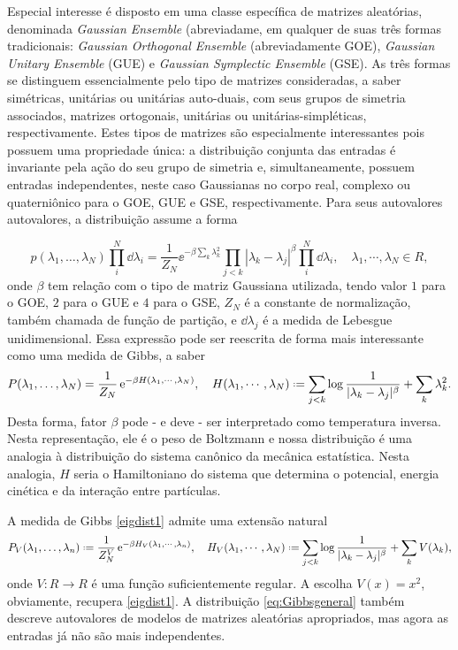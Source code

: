Especial interesse é disposto em uma classe específica de matrizes aleatórias, denominada \textit{Gaussian Ensemble} (abreviadame, em qualquer de suas três formas tradicionais:  \textit{Gaussian Orthogonal Ensemble} (abreviadamente GOE), \textit{Gaussian Unitary Ensemble} (GUE) e \textit{Gaussian Symplectic Ensemble} (GSE). As três formas se distinguem essencialmente pelo tipo de matrizes consideradas, a saber simétricas, unitárias ou unitárias auto-duais, com seus grupos de simetria associados, matrizes ortogonais, unitárias ou unitárias-simpléticas, respectivamente. Estes tipos de matrizes são especialmente interessantes pois possuem uma propriedade única: a distribuição conjunta das entradas é invariante pela ação do seu grupo de simetria e, simultaneamente, possuem entradas independentes, neste caso Gaussianas no corpo real, complexo ou quaterniônico para o GOE, GUE e GSE, respectivamente. Para seus autovalores autovalores, a distribuição assume a forma

\begin{equation*}
	p(\lambda_1, \ldots, \lambda_N) \prod_{i}^{N}\dd \lambda_i = \frac{1}{Z_N} \ee^{-\beta \sum_{k}\lambda_k^2}\prod_{j<k}|\lambda_k - \lambda_j|^\beta \prod_{i}^{N}\dd \lambda_i , \quad \lambda_1,\cdots, \lambda_N\in R,
\end{equation*}
%
onde $\beta$ tem relação com o tipo de matriz Gaussiana utilizada, tendo valor $1$ para o GOE, $2$ para o GUE e $4$ para o GSE, $Z_N$ é a constante de normalização, também chamada de função de partição, e $\dd\lambda_j$ é a medida de Lebesgue unidimensional. Essa expressão pode ser reescrita de forma mais interessante como uma medida de Gibbs, a saber
%
\begin{equation}\label{eigdist1}
	P(\lambda_1, \ldots, \lambda_N)  = \frac{1}{Z_N} \ee^{-\beta H(\lambda_1,\cdots,\lambda_N)},\quad H(\lambda_1,\cdots,\lambda_N)\deff \sum_{j<k}\log\frac{1}{|\lambda_k - \lambda_j|^\beta}+\sum_{k}\lambda_k^2.
\end{equation}
%
Desta forma, fator $\beta$ pode - e deve - ser interpretado como temperatura inversa. Nesta representação, ele é o peso de Boltzmann e nossa distribuição é uma analogia à distribuição do sistema canônico da mecânica estatística. Nesta analogia, $H$ seria o Hamiltoniano do sistema que determina o potencial, energia cinética e da interação entre partículas.

A medida de Gibbs \eqref{eigdist1} admite uma extensão natural
%
\begin{equation}\label{eq:Gibbsgeneral}
	P_V(\lambda_1,\hdots,\lambda_n)\deff \frac{1}{Z^V_N}\ee^{-\beta H_V(\lambda_1,\cdots, \lambda_n)},\quad H_V(\lambda_1,\cdots,\lambda_N)\deff  \sum_{j<k}\log\frac{1}{|\lambda_k - \lambda_j|^\beta}+\sum_{k}V(\lambda_k),
\end{equation}
%
onde $V:R\to R$ é uma função suficientemente regular. A escolha $V(x)=x^2$, obviamente, recupera \eqref{eigdist1}. A distribuição \eqref{eq:Gibbsgeneral} também descreve autovalores de modelos de matrizes aleatórias apropriados, mas agora as entradas já não são mais independentes.